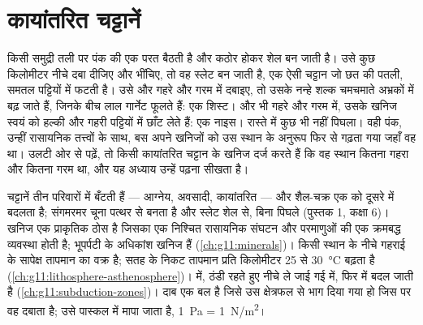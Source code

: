 \chapter{कायांतरित चट्टानें}\label{ch:g12:metamorphic-rocks}

किसी समुद्री तली पर पंक की एक परत बैठती है और कठोर होकर शेल बन जाती है। उसे कुछ
किलोमीटर नीचे दबा दीजिए और भींचिए, तो वह स्लेट बन जाती है, एक ऐसी चट्टान जो
छत की पतली, समतल पट्टियों में फटती है। उसे और गहरे और गरम में दबाइए, तो उसके नन्हे
शल्क चमचमाते अभ्रकों में बढ़ जाते हैं, जिनके बीच लाल गार्नेट फूलते हैं: एक शिस्ट।
और भी गहरे और गरम में, उसके खनिज स्वयं को हल्की और गहरी
पट्टियों में छाँट लेते हैं: एक नाइस। रास्ते में कुछ भी नहीं पिघला। वही पंक, उन्हीं
रासायनिक तत्त्वों के साथ, बस अपने खनिजों को उस स्थान के अनुरूप फिर से गढ़ता गया जहाँ वह
था। उलटी ओर से पढ़ें, तो किसी कायांतरित चट्टान के खनिज दर्ज करते हैं कि वह स्थान कितना गहरा
और कितना गरम था, और यह अध्याय उन्हें पढ़ना सीखता है।

\begin{recall}
चट्टानें तीन परिवारों में बँटती हैं --- आग्नेय, अवसादी, कायांतरित --- और
शैल-चक्र एक को दूसरे में बदलता है; संगमरमर चूना पत्थर से बनता है और
स्लेट शेल से, बिना पिघले (पुस्तक 1, कक्षा 6)। खनिज एक प्राकृतिक
ठोस है जिसका एक निश्चित रासायनिक संघटन और परमाणुओं की एक क्रमबद्ध
व्यवस्था होती है; भूपर्पटी के अधिकांश खनिज  हैं
(\cref{ch:g11:minerals})।  किसी स्थान के नीचे गहराई के सापेक्ष तापमान का
वक्र है; सतह के निकट तापमान प्रति किलोमीटर 25 से
\qty{30}{\celsius} बढ़ता है (\cref{ch:g11:lithosphere-asthenosphere})।
 में, ठंडी रहते हुए नीचे ले जाई गई 
 में, फिर  में बदल जाती है (\cref{ch:g11:subduction-zones})।
दाब एक बल है जिसे उस क्षेत्रफल से भाग दिया गया हो जिस पर वह दबाता है; उसे
पास्कल में मापा जाता है, \qty{1}{Pa} = \qty{1}{N/m^2}।
\end{recall}

